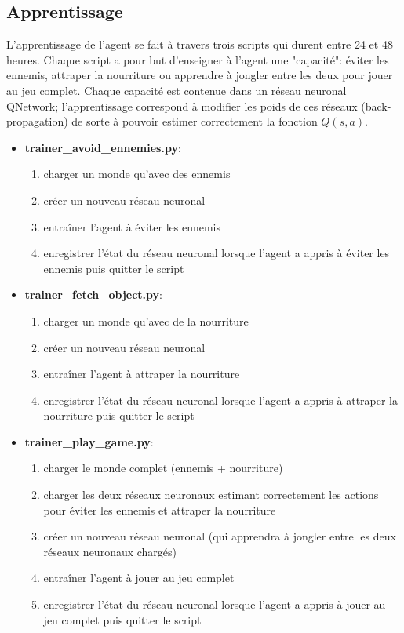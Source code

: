 \documentclass[11pt,a4paper]{report}
\begin{document}
  \subsection{Apprentissage}
    
  \par L'apprentissage de l'agent se fait à travers trois scripts qui durent entre 24 et 48 heures. Chaque script a pour but d'enseigner à l'agent une "capacité": éviter les ennemis, attraper la nourriture ou apprendre à jongler entre les deux pour jouer au jeu complet. Chaque capacité est contenue dans un réseau neuronal QNetwork; l'apprentissage correspond à modifier les poids de ces réseaux (back-propagation) de sorte à pouvoir estimer correctement la fonction $Q(s,a)$.

  \renewcommand{\labelitemi}{\textbullet}
  \begin{itemize}
  \item \textbf{trainer\_avoid\_ennemies.py}: 
      \begin{enumerate}
      \item charger un monde qu'avec des ennemis
      \item créer un nouveau réseau neuronal 
      \item entraîner l'agent à éviter les ennemis
      \item enregistrer l'état du réseau neuronal lorsque l'agent  a appris à éviter les ennemis puis quitter le script
      \end{enumerate}
  \item \textbf{trainer\_fetch\_object.py}: 
      \begin{enumerate}
      \item charger un monde qu'avec de la nourriture
      \item créer un nouveau réseau neuronal
      \item entraîner l'agent à attraper la nourriture
      \item enregistrer l'état du réseau neuronal lorsque l'agent  a appris à attraper la nourriture puis quitter le script
      \end{enumerate}  
  \item \textbf{trainer\_play\_game.py}:
      \begin{enumerate}
      \item charger le monde complet (ennemis + nourriture)
      \item charger les deux réseaux neuronaux estimant correctement les actions pour éviter les ennemis et attraper la nourriture
      \item créer un nouveau réseau neuronal (qui apprendra à jongler entre les deux réseaux neuronaux chargés)
      \item entraîner l'agent à jouer au jeu complet
      \item enregistrer l'état du réseau neuronal lorsque l'agent  a appris à jouer au jeu complet puis quitter le script
      \end{enumerate}
  \end{itemize}
  
\end{document}
